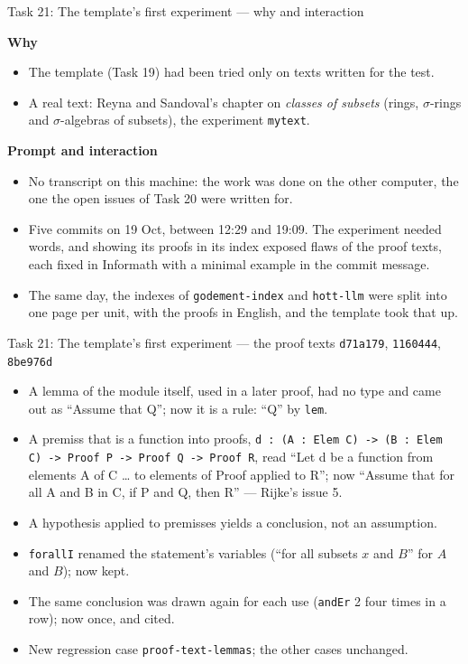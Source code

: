 \documentclass[10pt,aspectratio=169]{beamer}
\newcommand{\bad}[1]{\textcolor{warn}{#1}}
\newcommand{\ok}[1]{\textcolor{good}{#1}}
\newcommand{\commit}[1]{\texttt{\footnotesize #1}}
\newcommand{\why}{\par\textcolor{gfblue}{\textbf{Why}}\par}
\newcommand{\how}{\par\textcolor{gfblue}{\textbf{Prompt and interaction}}\par}
\begin{document}
\begin{frame}{Task 21: The template's first experiment --- why and interaction}
  \why
  \begin{itemize}\small
    \item The template (Task 19) had been tried only on texts written for the test.
    \item A real text: Reyna and Sandoval's chapter on \emph{classes of subsets}
          (rings, $\sigma$-rings and $\sigma$-algebras of subsets), the experiment
          \texttt{mytext}.
  \end{itemize}
  \how
  \begin{itemize}\small
    \item No transcript on this machine: the work was done on the other computer, the
          one the open issues of Task 20 were written for.
    \item Five commits on 19 Oct, between 12:29 and 19:09. The experiment needed words,
          and showing its proofs in its index exposed flaws of the proof texts, each
          fixed in Informath with a minimal example in the commit message.
    \item The same day, the indexes of \texttt{godement-index} and \texttt{hott-llm}
          were split into one page per unit, with the proofs in English, and the
          template took that up.
  \end{itemize}
\end{frame}

\begin{frame}[fragile]{Task 21: The template's first experiment --- the proof texts}
  \commit{d71a179}, \commit{1160444}, \commit{8be976d}
  \begin{itemize}\small
    \item A lemma of the module itself, used in a later proof, had no type and came out
          as \bad{``Assume that Q''}; now it is a rule: ``Q'' by \texttt{lem}.
    \item A premiss that is a function into proofs,
          \texttt{d : (A : Elem C) -> (B : Elem C) -> Proof P -> Proof Q -> Proof R},
          read \bad{``Let d be a function from elements A of C \dots{} to elements of
          Proof applied to R''}; now \ok{``Assume that for all A and B in C, if P and Q,
          then R''} --- Rijke's issue 5.
    \item A hypothesis applied to premisses yields a conclusion, not an assumption.
    \item \texttt{forallI} renamed the statement's variables
          (\bad{``for all subsets $x$ and $B$''} for $A$ and $B$); now kept.
    \item The same conclusion was drawn again for each use (\bad{\texttt{andEr} 2}
          four times in a row); now once, and cited.
  \end{itemize}
  \begin{itemize}\footnotesize
    \item New regression case \texttt{proof-text-lemmas}; the other cases unchanged.
  \end{itemize}
\end{frame}
\end{document}
